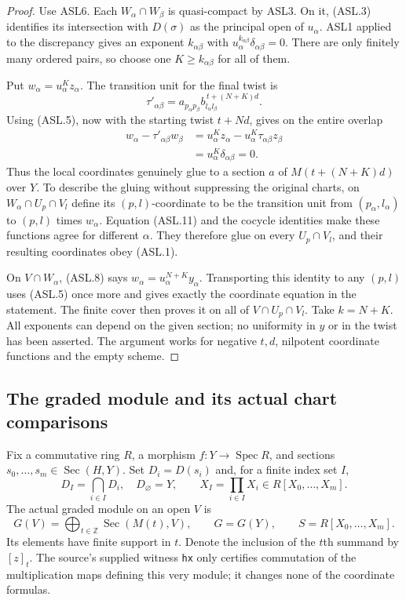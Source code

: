 \begin{proof}
Use ASL6.  Each $W_\alpha\cap W_\beta$ is quasi-compact by
ASL3.  On it, (ASL.3) identifies its intersection with
$D(\sigma)$ as the principal open of $u_\alpha$.
ASL1 applied to the discrepancy gives an exponent
$k_{\alpha\beta}$ with
$u_\alpha^{k_{\alpha\beta}}\delta_{\alpha\beta}=0$.
There are only finitely many ordered pairs, so choose one
$K\ge k_{\alpha\beta}$ for all of them.

Put $w_\alpha=u_\alpha^Kz_\alpha$.  The transition unit for
the final twist is
\[
 \tau'_{\alpha\beta}
   =a_{p_\alpha p_\beta}
            b_{l_\alpha l_\beta}^{\,t+(N+K)d}.
\]
Using (ASL.5), now with the starting twist $t+Nd$, gives on
the entire overlap
\[
 \begin{split}
 w_\alpha-\tau'_{\alpha\beta}w_\beta
  &=u_\alpha^Kz_\alpha
             -u_\alpha^K\tau_{\alpha\beta}z_\beta\\
  &=u_\alpha^K\delta_{\alpha\beta}=0.
 \end{split}                                            \tag{ASL.11}
\]
Thus the local coordinates genuinely glue to a section $a$ of
$M(t+(N+K)d)$ over $Y$.  To describe the gluing without suppressing
the original charts, on $W_\alpha\cap U_p\cap V_l$ define its
$(p,l)$-coordinate to be the transition unit from
$(p_\alpha,l_\alpha)$ to $(p,l)$ times $w_\alpha$.
Equation (ASL.11) and the cocycle identities make these functions
agree for different $\alpha$.  They therefore glue on every
$U_p\cap V_l$, and their resulting coordinates obey (ASL.1).

On $V\cap W_\alpha$, (ASL.8) says
$w_\alpha=u_\alpha^{N+K}y_\alpha$.
Transporting this identity to any $(p,l)$ uses (ASL.5) once
more and gives exactly the coordinate equation in the statement.
The finite cover then proves it on all of
$V\cap U_p\cap V_l$.  Take $k=N+K$.
All exponents can depend on the given section; no uniformity in
$y$ or in the twist has been asserted.  The argument works for
negative $t,d$, nilpotent coordinate functions and the empty scheme.
\end{proof}

\subsection{The graded module and its actual chart comparisons}

Fix a commutative ring $R$, a morphism
$f:Y\to\operatorname{Spec}R$, and sections
$s_0,\ldots,s_m\in\operatorname{Sec}(H,Y)$.
Set $D_i=D(s_i)$ and, for a finite index set $I$,
\[
 D_I=\bigcap_{i\in I}D_i,\quad D_\varnothing=Y,
 \qquad X_I=\prod_{i\in I}X_i\in R[X_0,\ldots,X_m].
                                                        \tag{ASL.12}
\]
The actual graded module on an open $V$ is
\[
 G(V)=\bigoplus_{t\in\mathbb Z}\operatorname{Sec}(M(t),V),
 \qquad G=G(Y),\qquad S=R[X_0,\ldots,X_m].          \tag{ASL.13}
\]
Its elements have finite support in $t$.  Denote the inclusion of
the $t$th summand by $[z]_t$.  The source's supplied witness
\texttt{hx} only certifies commutation of the multiplication maps
defining this very module; it changes none of the coordinate formulas.

